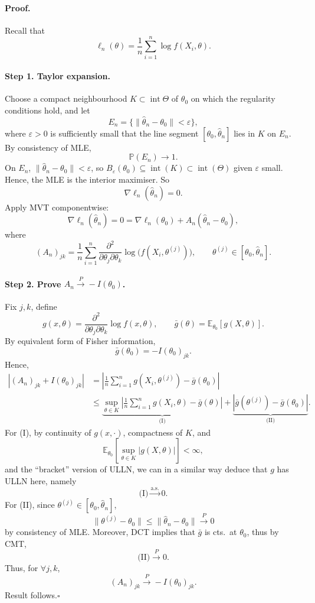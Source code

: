 \documentclass[11pt,a4paper]{article}
\begin{document}
\paragraph{Proof.}
Recall that
\[
\ell_n(\theta)=\frac1n\sum_{i=1}^n\log f(X_i,\theta).
\]

\paragraph{Step 1. Taylor expansion.}
Choose a compact neighbourhood $K\subset\operatorname{int}\Theta$
of $\theta_0$ on which the regularity conditions hold,
and let
\[
E_n=\{\|\hat{\theta}_n-\theta_0\|<\varepsilon\},
\]
where $\varepsilon>0$ is sufficiently small that the
line segment $[\theta_0,\hat{\theta}_n]$ lies in $K$ on $E_n$.
By consistency of MLE,
\[
\mathbb{P}(E_n)\to1.
\]
On $E_n$, $\|\hat{\theta}_n-\theta_0\|<\varepsilon$, so
$B_\varepsilon(\theta_0)\subseteq\operatorname{int}(K)\subset\operatorname{int}(\Theta)$
given $\varepsilon$ small.
Hence, the MLE is the interior maximiser.
So
\[
\nabla\ell_n(\hat{\theta}_n)=0.
\]
Apply MVT componentwise:
\[
\nabla\ell_n(\hat{\theta}_n)=0
=\nabla\ell_n(\theta_0)+A_n(\hat{\theta}_n-\theta_0),
\]
where
\[
(A_n)_{jk}=\frac1n\sum_{i=1}^n
\frac{\partial^2}{\partial\theta_j\partial\theta_k}
\log\bigl(f(X_i,\theta^{(j)})\bigr),
\qquad
\theta^{(j)}\in[\theta_0,\hat{\theta}_n].
\]

\paragraph{Step 2. Prove $A_n\xrightarrow{P}-I(\theta_0)$.}
Fix $j,k$, define
\[
g(x,\theta)=\frac{\partial^2}{\partial\theta_j\partial\theta_k}
\log f(x,\theta),
\qquad
\bar{g}(\theta)=\mathbb{E}_{\theta_0}[g(X,\theta)].
\]
By equivalent form of Fisher information,
\[
\bar{g}(\theta_0)=-I(\theta_0)_{jk}.
\]
Hence,
\[
\begin{aligned}
|(A_n)_{jk}+I(\theta_0)_{jk}|
&=\left|\frac1n\sum_{i=1}^n g(X_i,\theta^{(j)})-\bar{g}(\theta_0)\right|\\
&\leq\underbrace{\sup_{\theta\in K}
\left|\frac1n\sum_{i=1}^n g(X_i,\theta)-\bar{g}(\theta)\right|}_{\text{(I)}}
+\underbrace{|\bar{g}(\theta^{(j)})-\bar{g}(\theta_0)|}_{\text{(II)}}.
\end{aligned}
\]
For (I), by continuity of $g(x,\cdot)$, compactness of $K$, and
\[
\mathbb{E}_{\theta_0}\left[\sup_{\theta\in K}|g(X,\theta)|\right]<\infty,
\]
and the ``bracket'' version of ULLN, we can in a similar way deduce that
$g$ has ULLN here, namely
\[
\text{(I)}\xrightarrow{\mathrm{a.s.}}0.
\]
For (II), since $\theta^{(j)}\in[\theta_0,\hat{\theta}_n]$,
\[
\|\theta^{(j)}-\theta_0\|
\leq\|\hat{\theta}_n-\theta_0\|\xrightarrow{P}0
\]
by consistency of MLE.
Moreover, DCT implies that $\bar{g}$ is cts.\ at $\theta_0$,
thus by CMT,
\[
\text{(II)}\xrightarrow{P}0.
\]
Thus, for $\forall j,k$,
\[
(A_n)_{jk}\xrightarrow{P}-I(\theta_0)_{jk}.
\]
Result follows.\hfill$\square$
\end{document}
